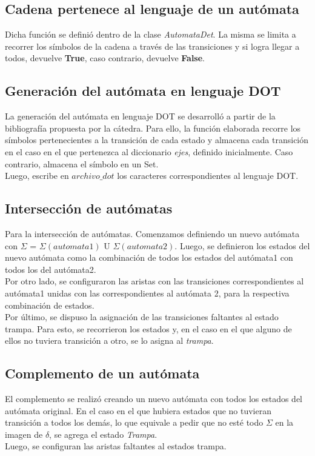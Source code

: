 \documentclass[a4paper, 10pt, twoside]{article}
\begin{document}
\subsection{Cadena pertenece al lenguaje de un autómata}
Dicha función se definió dentro de la clase \textit{AutomataDet}. La misma se limita a recorrer los símbolos de la cadena a través de las transiciones y si logra llegar a todos, devuelve \textbf{True}, caso contrario, devuelve \textbf{False}.

\subsection{Generación del autómata en lenguaje DOT}
La generación del autómata en lenguaje DOT se desarrolló a partir de la bibliografía propuesta por la cátedra. Para ello, la función elaborada recorre los símbolos pertenecientes a la transición de cada estado y almacena cada transición en el caso en el que pertenezca al diccionario \textit{ejes}, definido inicialmente. Caso contrario, almacena el símbolo en un Set.\\
Luego, escribe en $archivo\_dot$ los caracteres correspondientes al lenguaje DOT.

\subsection{Intersección de autómatas}
Para la intersección de autómatas. Comenzamos definiendo un nuevo autómata con $\Sigma$ = $\Sigma (automata1)$ U $\Sigma (automata2)$. Luego, se definieron los estados del nuevo autómata como la combinación de todos los estados del autómata1 con todos los del autómata2.\\
Por otro lado, se configuraron las aristas con las transiciones correspondientes al autómata1 unidas con las correspondientes al autómata 2, para la respectiva combinación de estados.\\
Por último, se dispuso la asignación de las transiciones faltantes al estado trampa. Para esto, se recorrieron los estados y, en el caso en el que alguno de ellos no tuviera transición a otro, se lo asigna al \textit{trampa}.

\subsection{Complemento de un autómata}
El complemento se realizó creando un nuevo autómata con todos los estados del autómata original. En el caso en el que hubiera estados que no tuvieran transición a todos los demás, lo que equivale a pedir que no esté todo $\Sigma$ en la imagen de $\delta$, se agrega el estado \textit{Trampa}.\\
Luego, se configuran las aristas faltantes al estados trampa.
\end{document}
